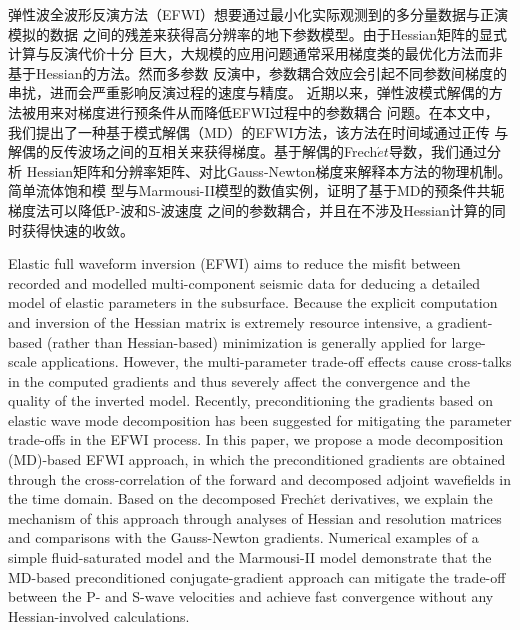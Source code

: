 \begin{cabstract}
	弹性波全波形反演方法（EFWI）想要通过最小化实际观测到的多分量数据与正演模拟的数据
	之间的残差来获得高分辨率的地下参数模型。由于Hessian矩阵的显式计算与反演代价十分
	巨大，大规模的应用问题通常采用梯度类的最优化方法而非基于Hessian的方法。然而多参数
	反演中，参数耦合效应会引起不同参数间梯度的串扰，进而会严重影响反演过程的速度与精度。
	近期以来，弹性波模式解偶的方法被用来对梯度进行预条件从而降低EFWI过程中的参数耦合
	问题。在本文中，我们提出了一种基于模式解偶（MD）的EFWI方法，该方法在时间域通过正传
	与解偶的反传波场之间的互相关来获得梯度。基于解偶的Frech$\acute{e}t$导数，我们通过分析
	Hessian矩阵和分辨率矩阵、对比Gauss-Newton梯度来解释本方法的物理机制。简单流体饱和模
	型与Marmousi-II模型的数值实例，证明了基于MD的预条件共轭梯度法可以降低P-波和S-波速度
	之间的参数耦合，并且在不涉及Hessian计算的同时获得快速的收敛。
\end{cabstract}


\begin{eabstract}
Elastic full waveform inversion (EFWI) aims to reduce the misfit between recorded and modelled multi-component
seismic data for deducing a detailed model of elastic parameters in the subsurface.
Because the explicit computation and inversion of the Hessian matrix
is extremely resource intensive,
a gradient-based (rather than Hessian-based) minimization is generally applied for large-scale applications.
However, the multi-parameter trade-off effects cause cross-talks in the computed gradients and
thus severely affect the convergence and the quality of the inverted model.
Recently, preconditioning the gradients based on elastic wave mode decomposition
has been suggested for mitigating the parameter trade-offs in the EFWI process.
In this paper, we propose a mode decomposition (MD)-based EFWI approach, in which the preconditioned gradients
are obtained through the cross-correlation of the forward and
decomposed adjoint wavefields in the time domain.
Based on the decomposed Frech{$\acute{e}$}t derivatives,
we explain the mechanism of this approach through analyses of Hessian and resolution matrices
and comparisons with the Gauss-Newton gradients.
Numerical examples of a simple fluid-saturated model and the Marmousi-II model
demonstrate that the MD-based preconditioned conjugate-gradient approach
can mitigate the trade-off between the P- and S-wave velocities and achieve fast
convergence without any Hessian-involved calculations.
\end{eabstract}

